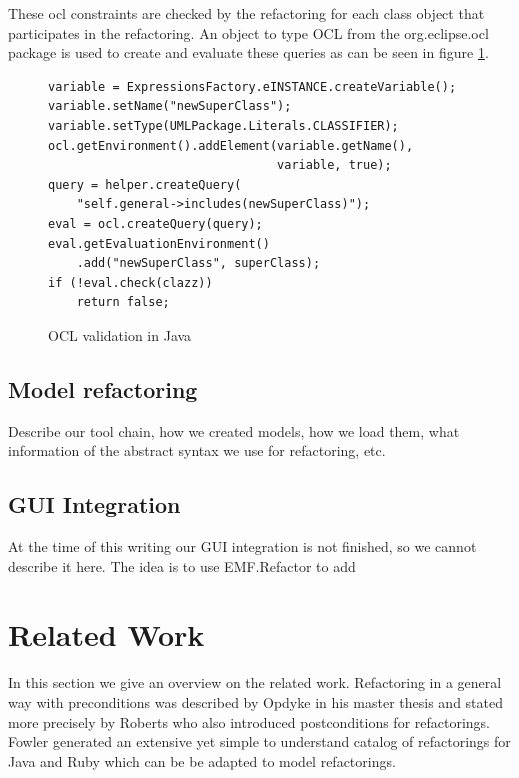 \documentclass{llncs}
\begin{document}
These ocl constraints are checked by the refactoring for each class object that participates
in the refactoring. An object to type OCL from the org.eclipse.ocl package is used to create and evaluate these queries
as can be seen in figure \ref{lst:ocl}.

\begin{figure}
\begin{lstlisting}
variable = ExpressionsFactory.eINSTANCE.createVariable();
variable.setName("newSuperClass");
variable.setType(UMLPackage.Literals.CLASSIFIER);
ocl.getEnvironment().addElement(variable.getName(),
                                variable, true);
query = helper.createQuery(
    "self.general->includes(newSuperClass)");
eval = ocl.createQuery(query);
eval.getEvaluationEnvironment()
    .add("newSuperClass", superClass);
if (!eval.check(clazz))
    return false;
\end{lstlisting}
\caption{OCL validation in Java}
\label{lst:ocl}
\end{figure}



\subsection{Model refactoring}
Describe our tool chain, how we created models, how we load them, what information of the abstract syntax we use for refactoring, etc.

\subsection{GUI Integration}
At the time of this writing our GUI integration is not finished, so we cannot describe it here. The idea is to use EMF.Refactor to add 

\section{Related Work}
\label{sec:relatedwork}

In this section we give an overview on the related work. Refactoring in a general way with preconditions was described
by Opdyke \cite{mast:REFOOF} in his master thesis and stated more precisely by Roberts \cite{rob99} who also introduced
postconditions for refactorings. Fowler \cite{fow99} generated an extensive yet simple to understand catalog of
refactorings for Java and Ruby which can be be adapted to model refactorings.
\end{document}
